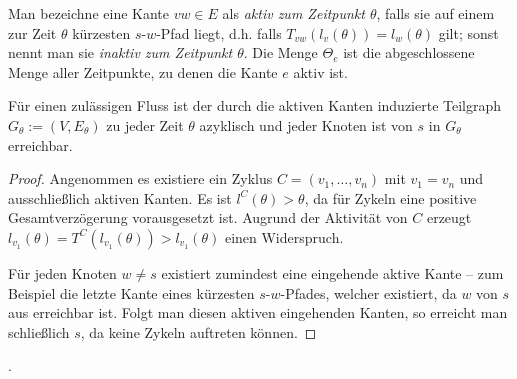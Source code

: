\begin{definition}
	Man bezeichne eine Kante $vw\in E$ als \emph{aktiv zum Zeitpunkt $\theta$}, falls sie auf einem zur Zeit $\theta$ kürzesten $s$-$w$-Pfad liegt, d.h. falls $T_{vw}(l_v(\theta)) = l_w(\theta)$ gilt; sonst nennt man sie \emph{inaktiv zum Zeitpunkt $\theta$}.
	Die Menge $\Theta_e$ ist die abgeschlossene Menge aller Zeitpunkte, zu denen die Kante $e$ aktiv ist.
\end{definition}

\begin{lemma}\label{lemma-shortest-path-using-active-edges}
	Für einen zulässigen Fluss ist der durch die aktiven Kanten induzierte Teilgraph $G_\theta:=(V, E_\theta)$ zu jeder Zeit $\theta$ azyklisch und jeder Knoten ist von $s$ in $G_\theta$ erreichbar.
\end{lemma}
\begin{proof}
	Angenommen es existiere ein Zyklus $C=(v_1, \dots, v_n)$ mit $v_1=v_n$ und ausschließlich aktiven Kanten.
	Es ist $l^C(\theta) > \theta$, da für Zykeln eine positive Gesamtverzögerung vorausgesetzt ist.
	Augrund der Aktivität von $C$ erzeugt $l_{v_1}(\theta) = T^C(l_{v_1}(\theta)) > l_{v_1}(\theta)$ einen Widerspruch.
	
	Für jeden Knoten $w\neq s$ existiert zumindest eine eingehende aktive Kante -- zum Beispiel die letzte Kante eines kürzesten $s$-$w$-Pfades, welcher existiert, da $w$ von $s$ aus erreichbar ist.
	Folgt man diesen aktiven eingehenden Kanten, so erreicht man schließlich $s$, da keine Zykeln auftreten können.
\end{proof}

.

